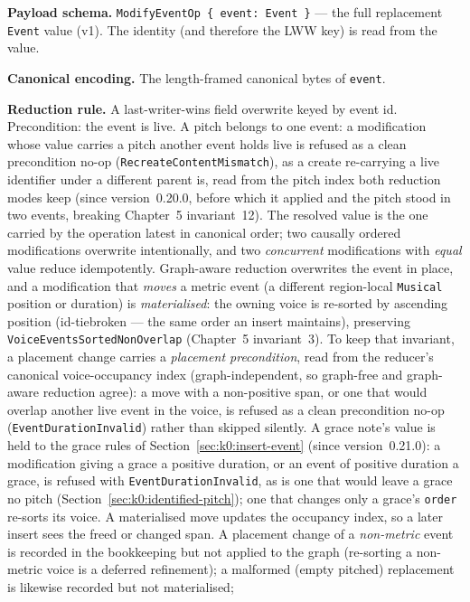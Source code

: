 \documentclass[11pt,letterpaper]{report}
\begin{document}
\textbf{Payload schema.} \texttt{ModifyEventOp \{ event: Event \}} --- the full
replacement \texttt{Event} value (v1). The identity (and therefore the LWW key)
is read from the value.

\textbf{Canonical encoding.} The length-framed canonical bytes of \texttt{event}.

\textbf{Reduction rule.} A last-writer-wins field overwrite keyed by event id.
Precondition: the event is live. A pitch belongs to one event: a modification
whose value carries a pitch another event holds live is refused as a clean
precondition no-op (\texttt{RecreateContentMismatch}), as a create re-carrying a
live identifier under a different parent is, read from the pitch index both
reduction modes keep (since version~0.20.0, before which it applied and the
pitch stood in two events, breaking Chapter~5 invariant~12). The resolved value
is the one carried by the
operation latest in canonical order; two causally ordered modifications overwrite
intentionally, and two \emph{concurrent} modifications with \emph{equal} value
reduce idempotently. Graph-aware reduction overwrites the event in place, and a
modification that \emph{moves} a metric event (a different region-local
\texttt{Musical} position or duration) is \emph{materialised}: the owning voice
is re-sorted by ascending position (id-tiebroken --- the same order an insert
maintains), preserving \texttt{VoiceEventsSortedNonOverlap} (Chapter~5
invariant~3). To keep that invariant, a placement change carries a
\emph{placement precondition}, read from the reducer's canonical voice-occupancy
index (graph-independent, so graph-free and graph-aware reduction agree): a move
with a non-positive span, or one that would overlap another live event in the
voice, is refused as a clean precondition no-op (\texttt{EventDurationInvalid})
rather than skipped silently. A grace note's value is held to the grace rules
of Section~\ref{sec:k0:insert-event} (since version~0.21.0): a modification
giving a grace a positive duration, or an event of positive duration a grace,
is refused with \texttt{EventDurationInvalid}, as is one that would leave a
grace no pitch (Section~\ref{sec:k0:identified-pitch}); one that changes only a
grace's \texttt{order} re-sorts its voice. A materialised move updates the occupancy index,
so a later insert sees the freed or changed span. A placement change of a
\emph{non-metric} event is recorded in the bookkeeping but not applied to the
graph (re-sorting a non-metric voice is a deferred refinement); a malformed
(empty pitched) replacement is likewise recorded but not materialised;
\end{document}
